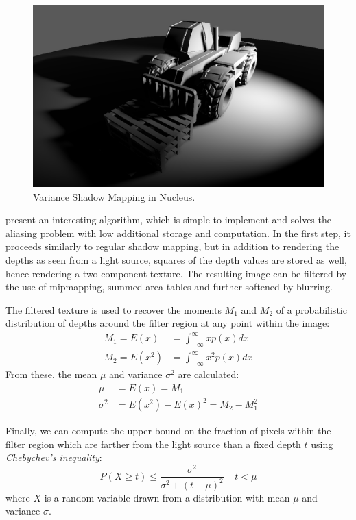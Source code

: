 \begin{figure}[ht!]
  \centering
    \includegraphics[width=0.9\linewidth]{./Figures/shadowMapping/manitouVSM.png}
    \caption[VSM in Nucleus]{Variance Shadow Mapping in Nucleus.}
  \label{fig:NucleusVSM}
\end{figure}

\citet{Donnelly06varianceshadow} present an interesting algorithm, which is simple to implement and solves the aliasing problem with low additional storage and computation. In the first step, it proceeds similarly to regular shadow mapping, but in addition to rendering the depths as seen from a light source, squares of the depth values are stored as well, hence rendering a two-component texture. The resulting image can be filtered by the use of mipmapping, summed area tables and further softened by blurring.

The filtered texture is used to recover the moments $M_1$ and $M_2$ of a probabilistic distribution of depths around the filter region at any point within the image:
\begin{align*}
M_1 = E(x) &= \int_{-\infty}^\infty xp(x)dx \\
M_2 = E(x^2) &= \int_{-\infty}^\infty x^2p(x)dx
\end{align*}
From these, the mean $\mu$ and variance $\sigma^2$ are calculated:
\begin{align*}
\mu &= E(x) = M_1\\
\sigma^2 &= E(x^2) - E(x)^2 = M_2 - M_1^2
\end{align*}

Finally, we can compute the upper bound on the fraction of pixels within the filter region which are farther from the light source than a fixed depth $t$ using \emph{Chebychev's inequality}:
\[
P(X \geq t) \leq \frac{\sigma^2}{\sigma^2 + (t - \mu)^2} \;\;\;\; t < \mu
\]
where $X$ is a random variable drawn from a distribution with mean $\mu$ and variance $\sigma$.

